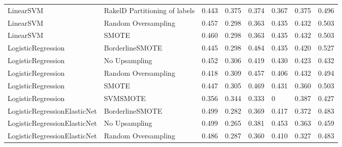 \begin{tabular}{llllllll}
                      LinearSVM & RakelD Partitioning of labels & 0.443 &                     0.375 &                 0.374 &                  0.367 &                                   0.375 &    0.496 \\
                      LinearSVM &           Random Oversampling & 0.457 &                     0.298 &                 0.363 &                  0.435 &                                   0.432 &    0.503 \\
                      LinearSVM &                         SMOTE & 0.460 &                     0.298 &                 0.363 &                  0.435 &                                   0.432 &    0.503 \\
             LogisticRegression &               BorderlineSMOTE & 0.445 &                     0.298 &                 0.484 &                  0.435 &                                   0.420 &    0.527 \\
             LogisticRegression &                 No Upsampling & 0.452 &                     0.306 &                 0.419 &                  0.430 &                                   0.423 &    0.432 \\
             LogisticRegression &           Random Oversampling & 0.418 &                     0.309 &                 0.457 &                  0.406 &                                   0.432 &    0.494 \\
             LogisticRegression &                         SMOTE & 0.447 &                     0.305 &                 0.469 &                  0.431 &                                   0.360 &    0.503 \\
             LogisticRegression &                      SVMSMOTE & 0.356 &                     0.344 &                 0.333 &                      0 &                                   0.387 &    0.427 \\
   LogisticRegressionElasticNet &               BorderlineSMOTE & 0.499 &                     0.282 &                 0.369 &                  0.417 &                                   0.372 &    0.483 \\
   LogisticRegressionElasticNet &                 No Upsampling & 0.499 &                     0.265 &                 0.381 &                  0.453 &                                   0.363 &    0.459 \\
   LogisticRegressionElasticNet &           Random Oversampling & 0.486 &                     0.287 &                 0.360 &                  0.410 &                                   0.327 &    0.483 \\

\end{tabular}
